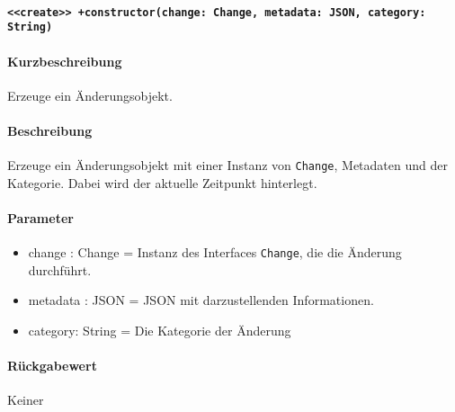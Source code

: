 \paragraph{\texttt{<<create>> +constructor(change: Change, metadata: JSON, category: String)}}%
\paragraph*{Kurzbeschreibung}
Erzeuge ein Änderungsobjekt.
\paragraph*{Beschreibung}
Erzeuge ein Änderungsobjekt mit einer Instanz von \verb#Change#, Metadaten und der Kategorie.
Dabei wird der aktuelle Zeitpunkt hinterlegt.
\paragraph*{Parameter}
\begin{itemize}
    \item change : Change = Instanz des Interfaces \verb#Change#, die die Änderung durchführt.
    \item metadata : JSON = JSON mit darzustellenden Informationen.
    \item category: String = Die Kategorie der Änderung
\end{itemize}
\paragraph*{Rückgabewert}
Keiner